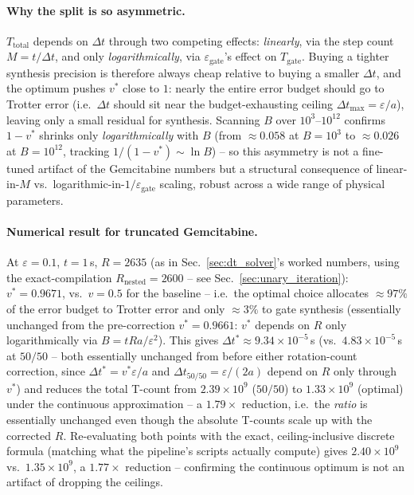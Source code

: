 \documentclass[11pt]{article}
\newcommand{\Dt}{\Delta t}
\begin{document}
\paragraph{Why the split is so asymmetric.} $T_{\text{total}}$ depends on $\Dt$ through two competing effects: \emph{linearly}, via the step count $M=t/\Dt$, and only \emph{logarithmically}, via $\varepsilon_{\text{gate}}$'s effect on $T_{\text{gate}}$. Buying a tighter synthesis precision is therefore always cheap relative to buying a smaller $\Dt$, and the optimum pushes $v^\ast$ close to $1$: nearly the entire error budget should go to Trotter error (i.e.\ $\Dt$ should sit near the budget-exhausting ceiling $\Dt_{\max}=\varepsilon/a$), leaving only a small residual for synthesis. Scanning $B$ over $10^3$--$10^{12}$ confirms $1-v^\ast$ shrinks only \emph{logarithmically} with $B$ (from $\approx0.058$ at $B=10^3$ to $\approx0.026$ at $B=10^{12}$, tracking $1/(1-v^\ast)\sim\ln B$) -- so this asymmetry is not a fine-tuned artifact of the Gemcitabine numbers but a structural consequence of linear-in-$M$ vs.\ logarithmic-in-$1/\varepsilon_{\text{gate}}$ scaling, robust across a wide range of physical parameters.

\paragraph{Numerical result for truncated Gemcitabine.} At $\varepsilon=0.1$, $t=1\,$s, $R=2635$ (as in Sec.~\ref{sec:dt_solver}'s worked numbers, using the exact-compilation $R_{\text{nested}}=2600$ -- see Sec.~\ref{sec:unary_iteration}): $v^\ast=0.9671$, vs.\ $v=0.5$ for the baseline -- i.e.\ the optimal choice allocates $\approx97\%$ of the error budget to Trotter error and only $\approx3\%$ to gate synthesis (essentially unchanged from the pre-correction $v^\ast=0.9661$: $v^\ast$ depends on $R$ only logarithmically via $B=tRa/\varepsilon^2$). This gives $\Dt^\ast\approx9.34\times10^{-5}\,$s (vs.\ $4.83\times10^{-5}\,$s at $50/50$ -- both essentially unchanged from before either rotation-count correction, since $\Dt^\ast=v^\ast\varepsilon/a$ and $\Dt_{50/50}=\varepsilon/(2a)$ depend on $R$ only through $v^\ast$) and reduces the total T-count from $2.39\times10^9$ ($50/50$) to $1.33\times10^9$ (optimal) under the continuous approximation -- a $1.79\times$ reduction, i.e.\ the \emph{ratio} is essentially unchanged even though the absolute T-counts scale up with the corrected $R$. Re-evaluating both points with the exact, ceiling-inclusive discrete formula (matching what the pipeline's scripts actually compute) gives $2.40\times10^9$ vs.\ $1.35\times10^9$, a $1.77\times$ reduction -- confirming the continuous optimum is not an artifact of dropping the ceilings.
\end{document}
